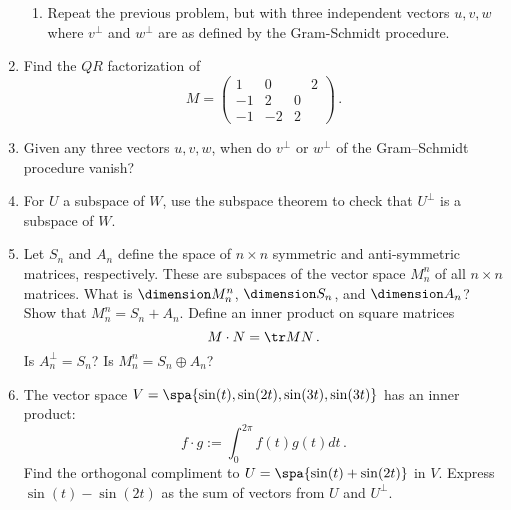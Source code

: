 \begin{enumerate}
\begin{enumerate}
\item Repeat the previous problem, but with three independent vectors $u,v,w$
 where $v^\perp$ and $w^\perp$ are as defined by the Gram-Schmidt procedure. 
\end{enumerate}



\item \label{QRprob} Find the $QR$ factorization of
\[
M=\begin{pmatrix}1&0&\phantom{\!-}2\\-1&2&0\\-1&-2&2
\end{pmatrix}\, .
\]


\item Given any three vectors $u,v,w$, when do $v^\perp$ or $w^\perp$ of the Gram--Schmidt procedure vanish?


\item For $U$ a subspace of $W$, use the subspace theorem to check that $U^\perp$ is a subspace of $W$.




\item %
Let $S_n$ and $A_n$ define the space of $n \times n$ symmetric and anti-symmetric matrices, respectively. These are subspaces of the vector space $M^n_n$ of all $n\times n$ matrices. What is $\dimension M^n_n$, $\dimension S_n$, and $\dimension A_n$? Show that $M^n_n = S_n + A_n$. Define an inner product on square matrices
\[
M\cdot N =\tr MN\, .
\]
Is $A_n^{\perp}=S_n$? Is $M^n_n = S_n \oplus A_n$?


\item The vector space $V=\spa\{ \sin(t),\sin(2t), \sin(3t) , \sin(3t)\}$ has an inner product: 
\[f\cdot g:=\int _0^{2\pi}f(t)g(t) dt\, .\] Find the orthogonal compliment to $U=\spa\{ \sin(t)+\sin(2t) \}$ in $V$. Express $\sin(t)-\sin(2t)$ as  the sum of vectors from $U$ and $U^\perp$.

\end{enumerate}

